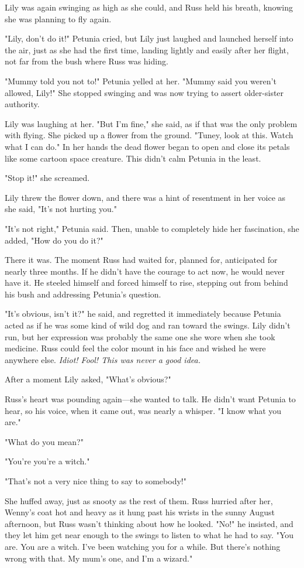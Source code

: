 Lily was again swinging as high as she could, and Russ held his breath, knowing she was planning to fly again.

"Lily, don't do it!" Petunia cried, but Lily just laughed and launched herself into the air, just as she had the first time, landing lightly and easily after her flight, not far from the bush where Russ was hiding.

"Mummy told you not to!" Petunia yelled at her. "Mummy said you weren't allowed, Lily!" She stopped swinging and was now trying to assert older-sister authority.

Lily was laughing at her. "But I'm fine," she said, as if that was the only problem with flying. She picked up a flower from the ground. "Tuney, look at this. Watch what I can do." In her hands the dead flower began to open and close its petals like some cartoon space creature. This didn't calm Petunia in the least.

"Stop it!" she screamed.

Lily threw the flower down, and there was a hint of resentment in her voice as she said, "It's not hurting you."

"It's not right," Petunia said. Then, unable to completely hide her fascination, she added, "How do you do it?"

There it was. The moment Russ had waited for, planned for, anticipated for nearly three months. If he didn't have the courage to act now, he would never have it. He steeled himself and forced himself to rise, stepping out from behind his bush and addressing Petunia's question.

"It's obvious, isn't it?" he said, and regretted it immediately because Petunia acted as if he was some kind of wild dog and ran toward the swings. Lily didn't run, but her expression was probably the same one she wore when she took medicine. Russ could feel the color mount in his face and wished he were anywhere else. \emph{Idiot! Fool! This was never a good idea.}

After a moment Lily asked, "What's obvious?"

Russ's heart was pounding again—she wanted to talk. He didn't want Petunia to hear, so his voice, when it came out, was nearly a whisper. "I know{\el} what you are."

"What do you mean?"

"You're{\el} you're a witch."

"That's not a very nice thing to say to somebody!"

She huffed away, just as snooty as the rest of them. Russ hurried after her, Wenny's coat hot and heavy as it hung past his wrists in the sunny August afternoon, but Russ wasn't thinking about how he looked. "No!" he insisted, and they let him get near enough to the swings to listen to what he had to say. "You{\el} are. You are a{\el} witch. I've been{\el} watching you for a{\el} while. But there's nothing{\el} wrong with that. My mum's{\el} one, and I'm a{\el} wizard."

